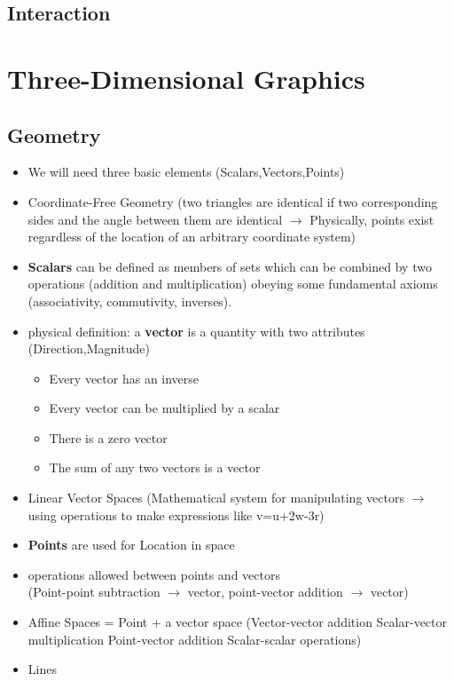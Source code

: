 \documentclass[11pt,a4paper]{article}
\begin{document}
	\subsection{Interaction}
		
\section{Three-Dimensional Graphics}
	\subsection{Geometry}
		\begin{itemize}
			\item We will need three basic elements	(Scalars,Vectors,Points)
			\item Coordinate-Free Geometry (two triangles are identical if two corresponding sides and the angle between them are identical $\rightarrow$ Physically, points exist regardless of the location of an arbitrary coordinate system)
			\item \textbf{Scalars} can be defined as members of sets which can be combined by two operations (addition and multiplication) obeying some fundamental axioms (associativity, commutivity, inverses).
			\item physical definition: a \textbf{vector} is a quantity with two attributes (Direction,Magnitude)
				\begin{itemize}
					\item Every vector has an inverse	
					\item Every vector can be multiplied by a scalar	
					\item There is a zero vector	
					\item The sum of any two vectors is a vector
				\end{itemize}
			\item Linear Vector Spaces (Mathematical system for manipulating vectors $\rightarrow$ using operations to make expressions like v=u+2w-3r)
			\item \textbf{Points} are used for Location in space
			\item operations allowed between points and vectors\\ (Point-point subtraction $\rightarrow$ vector, point-vector addition $\rightarrow$ vector)
			\item Affine Spaces = Point + a vector space (Vector-vector addition Scalar-vector multiplication Point-vector addition Scalar-scalar operations)
			\item Lines

\end{itemize}
\end{document}
